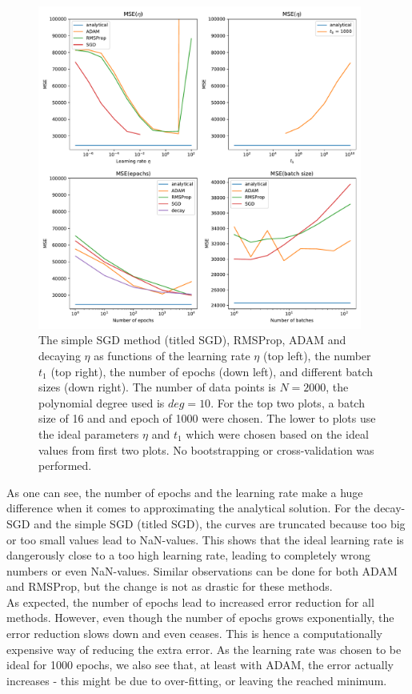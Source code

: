\documentclass[11pt,a4paper,titlepage]{article}
\begin{document}
\begin{figure}[H]
\centering
\includegraphics[width=0.95\textwidth]{OLS_error_SGD_idealLearningRate.pdf}
\caption[Test MSE Different SGD methods for OLS]{The simple SGD method (titled SGD), RMSProp, ADAM and decaying $\eta$ as functions of the learning rate $\eta$ (top left), the number $t_1$ (top right), the number of epochs (down left), and different batch sizes (down right). The number of data points is $N=2000$, the polynomial degree used is $deg=10$. For the top two plots, a batch size of 16 and and epoch of 1000 were chosen. The lower to plots use the ideal parameters $\eta$ and $t_1$ which were chosen based on the ideal values from first two plots. No bootstrapping or cross-validation was performed.}\label{fig:DifferentSGD}
\end{figure}
As one can see, the number of epochs and the learning rate make a huge difference when it comes to approximating the analytical solution. For the decay-SGD and the simple SGD (titled SGD), the curves are truncated because too big or too small values lead to NaN-values. This shows that the ideal learning rate is dangerously close to a too high learning rate, leading to completely wrong numbers or even NaN-values. Similar observations can be done for both ADAM and RMSProp, but the change is not as drastic for these methods.\\ 
As expected, the number of epochs lead to increased error reduction for all methods. However, even though the number of epochs grows exponentially, the error reduction slows down and even ceases. This is hence a computationally expensive way of reducing the extra error. As the learning rate was chosen to be ideal for 1000 epochs, we also see that, at least with ADAM, the error actually increases - this might be due to over-fitting, or leaving the reached minimum.\\
\end{document}
